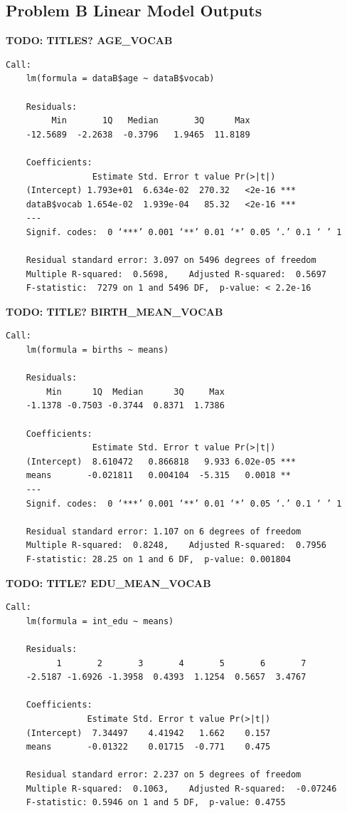 \documentclass[11pt]{article}  %
\begin{document}
\subsection{Problem B Linear Model Outputs}
\label{sec:lmoutB}
\textbf{TODO: TITLES? AGE\_VOCAB}
\label{sec:AVlm}
\begin{lstlisting}[basicstyle=\small]
    Call:
    lm(formula = dataB$age ~ dataB$vocab)
    
    Residuals:
         Min       1Q   Median       3Q      Max 
    -12.5689  -2.2638  -0.3796   1.9465  11.8189 
    
    Coefficients:
                 Estimate Std. Error t value Pr(>|t|)    
    (Intercept) 1.793e+01  6.634e-02  270.32   <2e-16 ***
    dataB$vocab 1.654e-02  1.939e-04   85.32   <2e-16 ***
    ---
    Signif. codes:  0 ‘***’ 0.001 ‘**’ 0.01 ‘*’ 0.05 ‘.’ 0.1 ‘ ’ 1
    
    Residual standard error: 3.097 on 5496 degrees of freedom
    Multiple R-squared:  0.5698,	Adjusted R-squared:  0.5697 
    F-statistic:  7279 on 1 and 5496 DF,  p-value: < 2.2e-16
\end{lstlisting}
\textbf{TODO: TITLE? BIRTH\_MEAN\_VOCAB}
\label{sec:BMVlm}
\begin{lstlisting}[basicstyle=\small]
    Call:
    lm(formula = births ~ means)
    
    Residuals:
        Min      1Q  Median      3Q     Max 
    -1.1378 -0.7503 -0.3744  0.8371  1.7386 
    
    Coefficients:
                 Estimate Std. Error t value Pr(>|t|)    
    (Intercept)  8.610472   0.866818   9.933 6.02e-05 ***
    means       -0.021811   0.004104  -5.315   0.0018 ** 
    ---
    Signif. codes:  0 ‘***’ 0.001 ‘**’ 0.01 ‘*’ 0.05 ‘.’ 0.1 ‘ ’ 1
    
    Residual standard error: 1.107 on 6 degrees of freedom
    Multiple R-squared:  0.8248,	Adjusted R-squared:  0.7956 
    F-statistic: 28.25 on 1 and 6 DF,  p-value: 0.001804
\end{lstlisting}
\textbf{TODO: TITLE? EDU\_MEAN\_VOCAB}
\label{sec:EMVlm}
\begin{lstlisting}[basicstyle=\small]
    Call:
    lm(formula = int_edu ~ means)
    
    Residuals:
          1       2       3       4       5       6       7 
    -2.5187 -1.6926 -1.3958  0.4393  1.1254  0.5657  3.4767 
    
    Coefficients:
                Estimate Std. Error t value Pr(>|t|)
    (Intercept)  7.34497    4.41942   1.662    0.157
    means       -0.01322    0.01715  -0.771    0.475
    
    Residual standard error: 2.237 on 5 degrees of freedom
    Multiple R-squared:  0.1063,	Adjusted R-squared:  -0.07246 
    F-statistic: 0.5946 on 1 and 5 DF,  p-value: 0.4755
\end{lstlisting}
\end{document}
